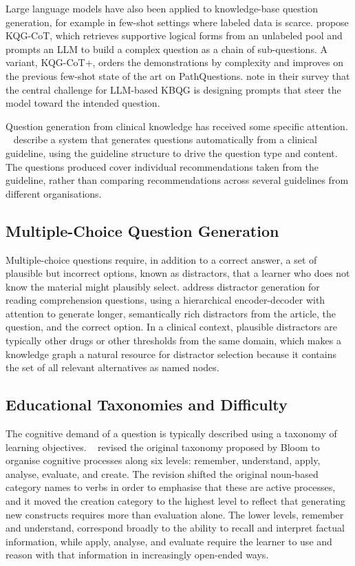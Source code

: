 Large language models have also been applied to knowledge-base question
generation, for example in few-shot settings where labeled data is scarce.
\cite{liang2023} propose KQG-CoT, which retrieves supportive logical forms
from an unlabeled pool and prompts an LLM to build a complex question as a
chain of sub-questions. A variant, KQG-CoT+, orders the demonstrations by
complexity and improves on the previous few-shot state of the art on
PathQuestions. \cite{guo2024} note in their survey that the central challenge
for LLM-based KBQG is designing prompts that steer the model toward the
intended question.

Question generation from clinical knowledge has received some specific
attention. ~\cite{nyameino2020} describe a system that
generates questions automatically from a clinical guideline, using the
guideline structure to drive the question type and content. The questions
produced cover individual recommendations taken from the guideline, rather
than comparing recommendations across several guidelines from different
organisations.

\subsection{Multiple-Choice Question Generation}
\label{sec:bg-qg-mcq}

Multiple-choice questions require, in addition to a correct answer, a set of
plausible but incorrect options, known as distractors, that a learner who does
not know the material might plausibly select. \cite{gao2019} address
distractor generation for reading comprehension questions, using a
hierarchical encoder-decoder with attention to generate longer, semantically
rich distractors from the article, the question, and the correct option. In a
clinical context, plausible distractors are typically other drugs or other
thresholds from the same domain, which makes a knowledge graph a natural
resource for distractor selection because it contains the set of all relevant
alternatives as named nodes.

\subsection{Educational Taxonomies and Difficulty}
\label{sec:bg-qg-bloom}

The cognitive demand of a question is typically described using a taxonomy of
learning objectives. ~\cite{anderson2001} revised the
original taxonomy proposed by Bloom to organise cognitive processes along six
levels: remember, understand, apply, analyse, evaluate, and create. The
revision shifted the original noun-based category names to verbs in order to
emphasise that these are active processes, and it moved the creation category
to the highest level to reflect that generating new constructs requires more
than evaluation alone. The lower levels, remember and understand, correspond
broadly to the ability to recall and interpret factual information, while
apply, analyse, and evaluate require the learner to use and reason with that
information in increasingly open-ended ways.

